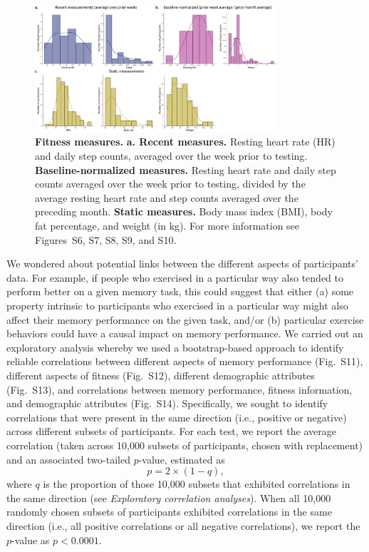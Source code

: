 \documentclass[10pt]{article}
\newcommand{\fitDists}{S6}
\newcommand{\fitDistgridImmediate}{S7}
\newcommand{\fitScatterImmediate}{S8}
\newcommand{\fitDistgridDelayed}{S9}
\newcommand{\fitScatterDelayed}{S10}
\newcommand{\behBehCorr}{S11}
\newcommand{\fitFitCorr}{S12}
\newcommand{\demDemCorr}{S13}
\newcommand{\allCorr}{S14}
\begin{document}
\begin{figure}[tp]
\centering
\includegraphics[width=0.8\textwidth]{figs/fitness_distributions_summary}
\caption{\textbf{Fitness measures.}  \textbf{a. Recent measures.}
  Resting heart rate (HR) and daily step counts, averaged over the
  week prior to testing.  \textbf{Baseline-normalized measures.}
  Resting heart rate and daily step counts averaged over the week
  prior to testing, divided by the average resting heart rate and step
counts averaged over the preceding month.  \textbf{Static measures.}
Body mass index (BMI), body fat percentage, and weight (in kg).  For
more information see Figures~\fitDists, \fitDistgridImmediate,
\fitScatterImmediate, \fitDistgridDelayed, and \fitScatterDelayed.}
\label{fig:fitness_summary}
\end{figure}

We wondered about potential links between the different aspects of
participants' data.  For example, if people who exercised in a
particular way also tended to perform better on a given memory task,
this could suggest that either (a) some property intrinsic to
participants who exercised in a particular way might also affect their
memory performance on the given task, and/or (b) particular exercise
behaviors could have a causal impact on memory performance.  We
carried out an exploratory analysis whereby we used a bootstrap-based
approach to identify reliable correlations between different aspects
of memory performance (Fig.~\behBehCorr), different aspects of fitness
(Fig.~\fitFitCorr), different demographic attributes
(Fig.~\demDemCorr), and correlations between memory performance,
fitness information, and demographic attributes (Fig.~\allCorr).
Specifically, we sought to identify correlations that were present in
the same direction (i.e., positive or negative) across different
subsets of participants.  For each test, we report the average correlation (taken
across 10,000 subsets of participants, chosen with replacement) and
an associated two-tailed $p$-value, estimated as
\[
p = 2 \times (1 - q),
\]
where $q$ is the proportion of those
10,000 subsets that exhibited correlations in the same direction  (see
\textit{Exploratory correlation analyses}).  When all 10,000 randomly
chosen subsets of participants exhibited correlations in the same
direction (i.e., all positive correlations or all negative
correlations), we report the $p$-value as $p < 0.0001$.
\end{document}
